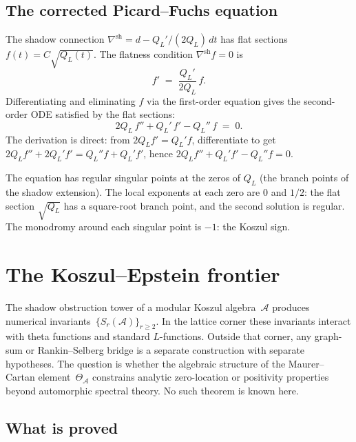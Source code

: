 \documentclass[11pt]{article}
\newcommand{\cA}{\mathcal{A}}
\begin{document}
\subsection{The corrected Picard--Fuchs equation}
\label{sec:corrected-picard-fuchs}

The shadow connection $\nabla^{\mathrm{sh}} = d - Q_L'/(2Q_L)\,dt$
has flat sections $f(t) = C\sqrt{Q_L(t)}$.  The flatness
condition $\nabla^{\mathrm{sh}} f = 0$ is
\[
f' \;=\; \frac{Q_L'}{2Q_L}\, f.
\]
Differentiating and eliminating $f$ via the first-order equation
gives the second-order ODE satisfied by the flat sections:
\begin{equation}\label{eq:picard-fuchs-corrected}
2Q_L\, f'' + Q_L'\, f' - Q_L''\, f \;=\; 0.
\end{equation}
The derivation is direct: from $2Q_L f' = Q_L' f$, differentiate
to get $2Q_L f'' + 2Q_L' f' = Q_L'' f + Q_L' f'$, hence
$2Q_L f'' + Q_L' f' - Q_L'' f = 0$.

The equation has regular singular points at the zeros of $Q_L$
(the branch points of the shadow extension).  The local exponents
at each zero are $0$ and $1/2$: the flat section $\sqrt{Q_L}$
has a square-root branch point, and the second solution is
regular.  The monodromy around each singular point is $-1$: the
Koszul sign.


\section{The Koszul--Epstein frontier}
\label{sec:koszul-epstein-frontier}

The shadow obstruction tower of a modular Koszul algebra~$\cA$
produces numerical invariants~$\{S_r(\cA)\}_{r \ge 2}$.  In the
lattice corner these invariants interact with theta functions and
standard $L$-functions.  Outside that corner, any graph-sum or
Rankin--Selberg bridge is a separate construction with separate
hypotheses.  The question is whether the algebraic structure of
the Maurer--Cartan element~$\Theta_\cA$ constrains analytic
zero-location or positivity properties beyond automorphic spectral
theory.  No such theorem is known here.

\subsection{What is proved}
\end{document}
